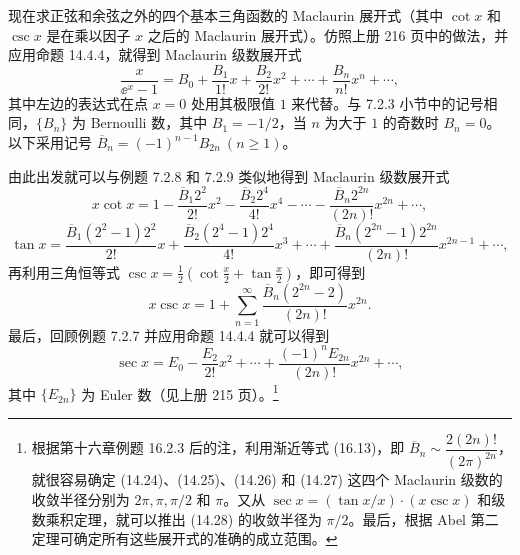 \begin{xexample}[14.4.2]
现在求正弦和余弦之外的四个基本三角函数的 Maclaurin 展开式（其中 $\cot x$ 和 $\csc x$ 是在乘以因子 $x$ 之后的 Maclaurin 展开式）。仿照上册 216 页中的做法，并应用命题 14.4.4，就得到 Maclaurin 级数展开式
\begin{equation}
  \frac{x}{\ee^x-1}=B_0+\frac{B_1}{1!}x+\frac{B_2}{2!}x^2+\cdots+\frac{B_n}{n!}x^n+\cdots,
  \tag{14.24}
  \label{eq:14.24}
\end{equation}
其中左边的表达式在点 $x=0$ 处用其极限值 $1$ 来代替。与 7.2.3 小节中的记号相同，$\{B_n\}$ 为 Bernoulli 数，其中 $B_1=-1/2$，当 $n$ 为大于 $1$ 的奇数时 $B_n=0$。以下采用记号 $\overline B_n=(-1)^{n-1}B_{2n}\ (n\geqslant1)$。

由此出发就可以与例题 7.2.8 和 7.2.9 类似地得到 Maclaurin 级数展开式
\begin{equation}
  x\cot x=1-\frac{\overline B_1 2^2}{2!}x^2-\frac{\overline B_2 2^4}{4!}x^4-\cdots-\frac{\overline B_n 2^{2n}}{(2n)!}x^{2n}+\cdots,
  \tag{14.25}
  \label{eq:14.25}
\end{equation}
\begin{equation}
  \tan x=\frac{\overline B_1(2^2-1)2^2}{2!}x+\frac{\overline B_2(2^4-1)2^4}{4!}x^3+\cdots+\frac{\overline B_n(2^{2n}-1)2^{2n}}{(2n)!}x^{2n-1}+\cdots,
  \tag{14.26}
  \label{eq:14.26}
\end{equation}
再利用三角恒等式 $\displaystyle\csc x=\frac12\left(\cot\frac x2+\tan\frac x2\right)$，即可得到
\begin{equation}
  x\csc x=1+\sum_{n=1}^{\infty}\frac{\overline B_n(2^{2n}-2)}{(2n)!}x^{2n}.
  \tag{14.27}
  \label{eq:14.27}
\end{equation}
最后，回顾例题 7.2.7 并应用命题 14.4.4 就可以得到
\begin{equation}
  \sec x=E_0-\frac{E_2}{2!}x^2+\cdots+\frac{(-1)^nE_{2n}}{(2n)!}x^{2n}+\cdots,
  \tag{14.28}
  \label{eq:14.28}
\end{equation}
其中 $\{E_{2n}\}$ 为 Euler 数（见上册 215 页）。\footnote{根据第十六章例题 16.2.3 后的注，利用渐近等式 (16.13)，即 $\overline B_n\sim\dfrac{2(2n)!}{(2\pi)^{2n}}$，就很容易确定 (14.24)、(14.25)、(14.26) 和 (14.27) 这四个 Maclaurin 级数的收敛半径分别为 $2\pi,\pi,\pi/2$ 和 $\pi$。又从 $\sec x=(\tan x/x)\cdot(x\csc x)$ 和级数乘积定理，就可以推出 (14.28) 的收敛半径为 $\pi/2$。最后，根据 Abel 第二定理可确定所有这些展开式的准确的成立范围。}
\end{xexample}

